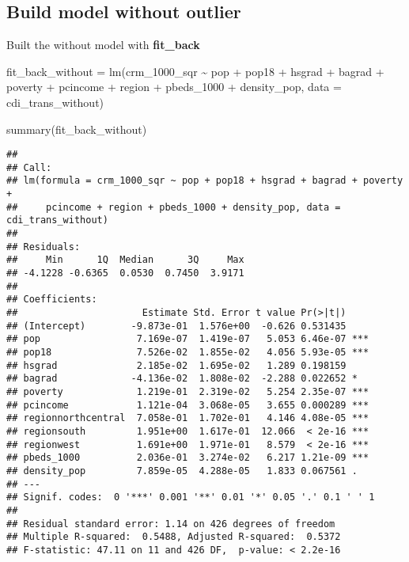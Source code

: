 \documentclass[
]{article}
\newenvironment{Shaded}{\begin{snugshade}}{\end{snugshade}}
\newcommand{\AttributeTok}[1]{\textcolor[rgb]{0.77,0.63,0.00}{#1}}
\newcommand{\FunctionTok}[1]{\textcolor[rgb]{0.00,0.00,0.00}{#1}}
\newcommand{\NormalTok}[1]{#1}
\newcommand{\OtherTok}[1]{\textcolor[rgb]{0.56,0.35,0.01}{#1}}
\newcommand{\SpecialCharTok}[1]{\textcolor[rgb]{0.00,0.00,0.00}{#1}}
\begin{document}
\hypertarget{build-model-without-outlier}{%
\subsection{Build model without
outlier}\label{build-model-without-outlier}}

Built the without model with \textbf{fit\_back}

\begin{Shaded}
\begin{Highlighting}[]
\NormalTok{fit\_back\_without }\OtherTok{=} \FunctionTok{lm}\NormalTok{(crm\_1000\_sqr }\SpecialCharTok{\textasciitilde{}}\NormalTok{ pop }\SpecialCharTok{+}\NormalTok{ pop18 }\SpecialCharTok{+}\NormalTok{ hsgrad }\SpecialCharTok{+}\NormalTok{ bagrad }\SpecialCharTok{+}\NormalTok{ poverty }\SpecialCharTok{+}\NormalTok{ pcincome }\SpecialCharTok{+}\NormalTok{ region }\SpecialCharTok{+}\NormalTok{ pbeds\_1000 }\SpecialCharTok{+}\NormalTok{ density\_pop, }\AttributeTok{data =}\NormalTok{ cdi\_trans\_without)}

\FunctionTok{summary}\NormalTok{(fit\_back\_without)}
\end{Highlighting}
\end{Shaded}

\begin{verbatim}
## 
## Call:
## lm(formula = crm_1000_sqr ~ pop + pop18 + hsgrad + bagrad + poverty + 
##     pcincome + region + pbeds_1000 + density_pop, data = cdi_trans_without)
## 
## Residuals:
##     Min      1Q  Median      3Q     Max 
## -4.1228 -0.6365  0.0530  0.7450  3.9171 
## 
## Coefficients:
##                      Estimate Std. Error t value Pr(>|t|)    
## (Intercept)        -9.873e-01  1.576e+00  -0.626 0.531435    
## pop                 7.169e-07  1.419e-07   5.053 6.46e-07 ***
## pop18               7.526e-02  1.855e-02   4.056 5.93e-05 ***
## hsgrad              2.185e-02  1.695e-02   1.289 0.198159    
## bagrad             -4.136e-02  1.808e-02  -2.288 0.022652 *  
## poverty             1.219e-01  2.319e-02   5.254 2.35e-07 ***
## pcincome            1.121e-04  3.068e-05   3.655 0.000289 ***
## regionnorthcentral  7.058e-01  1.702e-01   4.146 4.08e-05 ***
## regionsouth         1.951e+00  1.617e-01  12.066  < 2e-16 ***
## regionwest          1.691e+00  1.971e-01   8.579  < 2e-16 ***
## pbeds_1000          2.036e-01  3.274e-02   6.217 1.21e-09 ***
## density_pop         7.859e-05  4.288e-05   1.833 0.067561 .  
## ---
## Signif. codes:  0 '***' 0.001 '**' 0.01 '*' 0.05 '.' 0.1 ' ' 1
## 
## Residual standard error: 1.14 on 426 degrees of freedom
## Multiple R-squared:  0.5488, Adjusted R-squared:  0.5372 
## F-statistic: 47.11 on 11 and 426 DF,  p-value: < 2.2e-16
\end{verbatim}
\end{document}
